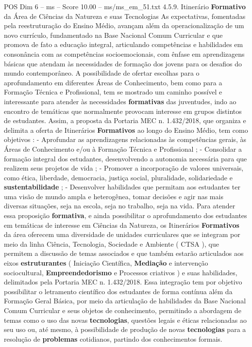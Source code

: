 \begin{textsample}{POS Dim 6 – ms – Score 10.00 – ms/ms\_em\_51.txt}  \label{ex:f6_pos_053}
4.5.9.
Itinerário \textbf{Formativo} da Área de Ciências da Natureza e suas Tecnologias As expectativas, fomentadas pela reestruturação do Ensino Médio, avançam além da operacionalização de um novo currículo, fundamentado na Base Nacional Comum Curricular e que promova de fato a educação integral, articulando competências e habilidades em consonância com as competências socioemocionais, com ênfase em aprendizagens básicas que atendam às necessidades de formação dos jovens para os desafios do mundo contemporâneo.
A possibilidade de ofertar escolhas para o aprofundamento em diferentes Áreas de Conhecimento, bem como para a Formação Técnica e Profissional, tem se mostrado um caminho possível e interessante para atender às necessidades \textbf{formativas} das juventudes, indo ao encontro de temáticas que normalmente provocam interesse em grupos distintos de estudantes.
Assim, a proposta da Portaria MEC n. 1.432/2018, que organiza e delimita a oferta de Itinerários \textbf{Formativos} ao longo do Ensino Médio, tem como objetivos : - Aprofundar as aprendizagens relacionadas às competências gerais, às Áreas de Conhecimento e/ou à Formação Técnica e Profissional ; - Consolidar a formação integral dos estudantes, desenvolvendo a autonomia necessária para que realizem seus projetos de vida ; - Promover a incorporação de valores universais, como ética, liberdade, democracia, justiça social, pluralidade, solidariedade e \textbf{sustentabilidade} ; - Desenvolver habilidades que permitam aos estudantes ter uma visão de mundo ampla e heterogênea, tomar decisões e agir nas mais diversas situações, seja na escola, seja no trabalho, seja na vida.
Para atender essa proposição \textbf{formativa}, e ainda possibilitar o aprofundamento dos estudantes em temáticas de interesse em Ciências da Natureza, os Itinerários \textbf{Formativos} da área oferecem uma diversidade de unidades curriculares que se integram por meio da linha Ciência, Tecnologia, Sociedade e Ambiente ( CTSA ), que permitem a discussão de temas associados e que também estarão articulados aos eixos \textbf{estruturantes} ( Iniciação Científica, \textbf{Mediação} e intervenção sociocultural, \textbf{Empreendedorismo} e Processos criativos ) e suas habilidades, delimitados pela Portaria MEC n. 1.432/2018.
Essa integração tem por objetivo possibilitar o letramento científico dos estudantes de forma contínua além da Formação Geral Básica, por meio da articulação de habilidades da Base Nacional Comum Curricular e seus objetos de conhecimento, permitindo a abordagem de temas como o uso das novas \textbf{tecnologias}, questões legais e éticas relacionadas ao seu uso ou, até mesmo, à possibilidade de produção de novas \textbf{tecnologias} para a resolução de \textbf{problemas} cotidianos, partindo dos conhecimentos formais.

\end{textsample}
